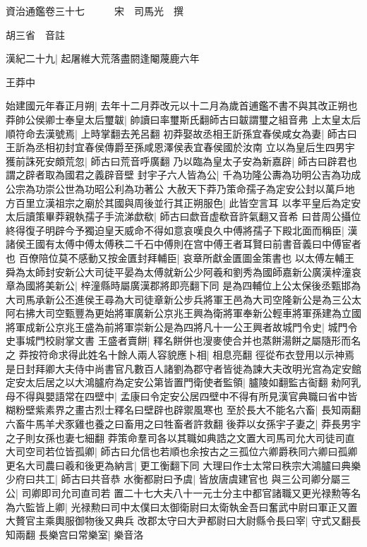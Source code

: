 資治通鑑卷三十七　　　宋　司馬光　撰

胡三省　音註

漢紀二十九|{
	起屠維大荒落盡閼逢閹蔑鹿六年}


王莽中

始建國元年春正月朔|{
	去年十二月莽改元以十二月為歲首逋鑑不書不與其改正朔也}
莽帥公侯卿士奉皇太后璽韍|{
	帥讀曰率璽斯氏翻師古曰韍謂璽之組音弗}
上太皇太后順符命去漢號焉|{
	上時掌翻去羌呂翻}
初莽娶故丞相王訢孫宜春侯咸女為妻|{
	師古曰王訢為丞相初封宜春侯傳爵至孫咸恩澤侯表宜春侯國於汝南}
立以為皇后生四男宇獲前誅死安頗荒忽|{
	師古曰荒音呼廣翻}
乃以臨為皇太子安為新嘉辟|{
	師古曰辟君也謂之辟者取為國君之義辟音壁}
封宇子六人皆為公|{
	千為功隆公夀為功明公吉為功成公宗為功崇公世為功昭公利為功著公}
大赦天下莽乃策命孺子為定安公封以萬戶地方百里立漢祖宗之廟於其國與周後並行其正朔服色|{
	此皆空言耳}
以孝平皇后為定安太后讀策畢莽親執孺子手流涕歔欷|{
	師古曰歔音虚欷音許氣翻又音希}
曰昔周公攝位終得復子明辟今予獨迫皇天威命不得如意哀嘆良久中傅將孺子下殿北面而稱臣|{
	漢諸侯王國有太傅中傅太傅秩二千石中傅則在宫中傅王者耳賢曰前書音義曰中傅宦者也}
百僚陪位莫不感動又按金匱封拜輔臣|{
	哀章所獻金匱圖金策書也}
以太傅左輔王舜為太師封安新公大司徒平晏為太傅就新公少阿羲和劉秀為國師嘉新公廣漢梓潼哀章為國將美新公|{
	梓潼縣時屬廣漢郡將即亮翻下同}
是為四輔位上公太保後丞甄邯為大司馬承新公丕進侯王尋為大司徒章新公步兵將軍王邑為大司空隆新公是為三公太阿右拂大司空甄豐為更始將軍廣新公京兆王興為衛將軍奉新公輕車將軍孫建為立國將軍成新公京兆王盛為前將軍崇新公是為四將凡十一公王興者故城門令史|{
	城門令史事城門校尉掌文書}
王盛者賣餅|{
	釋名餅併也溲麥使合并也蒸餅湯餅之屬隨形而名之}
莽按符命求得此姓名十餘人兩人容貌應卜相|{
	相息亮翻}
徑從布衣登用以示神焉是日封拜卿大夫侍中尚書官凡數百人諸劉為郡守者皆徙為諫大夫改明光宫為定安館定安太后居之以大鴻臚府為定安公第皆置門衛使者監領|{
	臚陵如翻監古䘖翻}
勑阿乳母不得與嬰語常在四壁中|{
	孟康曰令定安公居四壁中不得有所見漢官典職曰省中皆糊粉壁紫素界之畫古烈士釋名曰壁辟也辟禦風寒也}
至於長大不能名六畜|{
	長知兩翻六畜牛馬羊犬豕雞也養之曰畜用之曰牲畜者許救翻}
後莽以女孫宇子妻之|{
	莽長男宇之子則女孫也妻七細翻}
莽策命羣司各以其職如典誥之文置大司馬司允大司徒司直大司空司若位皆孤卿|{
	師古曰允信也若順也余按古之三孤位六卿爵秩同六卿曰孤卿}
更名大司農曰羲和後更為納言|{
	更工衡翻下同}
大理曰作士太常曰秩宗大鴻臚曰典樂少府曰共工|{
	師古曰共音恭}
水衡都尉曰予虞|{
	皆放唐虞建官也}
與三公司卿分屬三公|{
	司卿即司允司直司若}
置二十七大夫八十一元士分主中都官諸職又更光禄勲等名為六監皆上卿|{
	光禄勲曰司中太僕曰太御衛尉曰太衛執金吾曰奮武中尉曰軍正又置大贅官主乘輿服御物後又典兵}
改郡太守曰大尹都尉曰大尉縣令長曰宰|{
	守式又翻長知兩翻}
長樂宫曰常樂室|{
	樂音洛}
